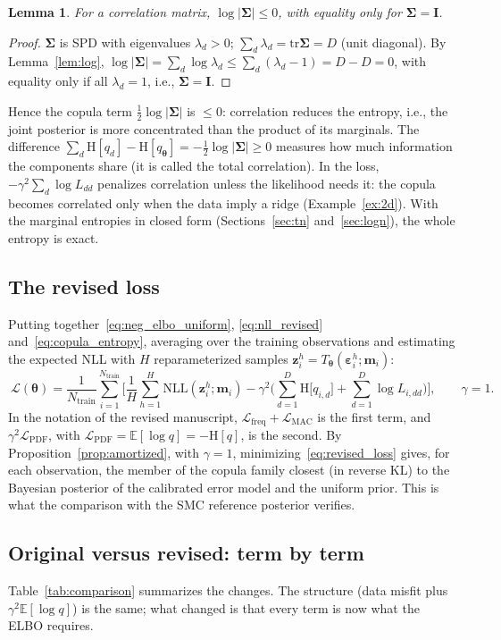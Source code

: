 \documentclass[11pt,a4paper]{article}
\numberwithin{equation}{section}
\theoremstyle{plain}
\newtheorem{lemma}[proposition]{Lemma}
\theoremstyle{definition}
\theoremstyle{remark}
\newcommand{\m}{\mathbf{m}}
\newcommand{\z}{\mathbf{z}}
\newcommand{\eps}{\bm{\varepsilon}}
\newcommand{\thetab}{\bm{\theta}}
\newcommand{\Sig}{\bm{\Sigma}}
\newcommand{\I}{\mathbf{I}}
\newcommand{\E}{\mathbb{E}}
\newcommand{\tr}{\mathrm{tr}}
\newcommand{\Hent}{\mathrm{H}}
\newcommand{\NLL}{\mathrm{NLL}}
\newcommand{\Lc}{\mathcal{L}}
\newcommand{\Ntr}{N_{\text{train}}}
\newcommand{\qth}{q_{\bm{\theta}}}
\begin{document}
\begin{lemma}
\label{lem:hadamard}
For a correlation matrix, $\log|\Sig|\le0$, with equality only for $\Sig=\I$.
\end{lemma}
\begin{proof}
$\Sig$ is SPD with eigenvalues $\lambda_d>0$; $\sum_d\lambda_d=\tr\Sig=D$ (unit diagonal). By Lemma~\ref{lem:log}, $\log|\Sig|=\sum_d\log\lambda_d\le\sum_d(\lambda_d-1)=D-D=0$, with equality only if all $\lambda_d=1$, i.e., $\Sig=\I$.
\end{proof}
Hence the copula term $\tfrac12\log|\Sig|$ is $\le0$: correlation reduces the entropy, i.e., the joint posterior is more concentrated than the product of its marginals. The difference $\sum_d\Hent[q_d]-\Hent[\qth]=-\tfrac12\log|\Sig|\ge0$ measures how much information the components share (it is called the total correlation). In the loss, $-\gamma^2\sum_d\log L_{dd}$ penalizes correlation unless the likelihood needs it: the copula becomes correlated only when the data imply a ridge (Example~\ref{ex:2d}). With the marginal entropies in closed form (Sections~\ref{sec:tn} and~\ref{sec:logn}), the whole entropy is exact.

\subsection{The revised loss}
Putting together~\eqref{eq:neg_elbo_uniform}, \eqref{eq:nll_revised} and~\eqref{eq:copula_entropy}, averaging over the training observations and estimating the expected NLL with $H$ reparameterized samples $\z_i^h=T_{\thetab}(\eps_i^h;\m_i)$:
\begin{equation}
\boxed{\ \Lc(\thetab)=\frac1{\Ntr}\sum_{i=1}^{\Ntr}\Bigg[\frac1H\sum_{h=1}^H\NLL(\z_i^h;\m_i)-\gamma^2\Big(\sum_{d=1}^D\Hent\big[q_{i,d}\big]+\sum_{d=1}^D\log L_{i,dd}\Big)\Bigg],\qquad\gamma=1.\ }
\label{eq:revised_loss}
\end{equation}
In the notation of the revised manuscript, $\Lc_{\text{freq}}+\Lc_{\text{MAC}}$ is the first term, and $\gamma^2\Lc_{\text{PDF}}$, with $\Lc_{\text{PDF}}=\E[\log q]=-\Hent[q]$, is the second. By Proposition~\ref{prop:amortized}, with $\gamma=1$, minimizing~\eqref{eq:revised_loss} gives, for each observation, the member of the copula family closest (in reverse KL) to the Bayesian posterior of the calibrated error model and the uniform prior. This is what the comparison with the SMC reference posterior verifies.

\subsection{Original versus revised: term by term}
Table~\ref{tab:comparison} summarizes the changes. The structure (data misfit plus $\gamma^2\E[\log q]$) is the same; what changed is that every term is now what the ELBO requires.
\end{document}
